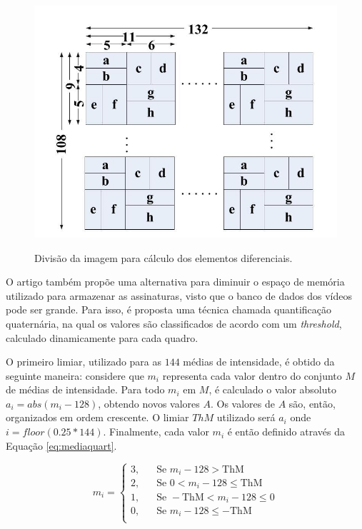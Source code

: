\begin{figure}[h]
  \centering
    \caption{Divisão da imagem para cálculo dos elementos diferenciais.} 
    \includegraphics[width=\textwidth]{dados/figuras/sf_division.png}
    \label{fig:divsceneframe}
\end{figure}

O artigo também propõe uma alternativa para diminuir o espaço de memória utilizado para armazenar as assinaturas, visto que o banco de dados dos vídeos pode ser grande. Para isso, é proposta uma técnica chamada quantificação quaternária, na qual os valores são classificados de acordo com um \textit{threshold}, calculado dinamicamente para cada quadro.

O primeiro limiar, utilizado para as $144$ médias de intensidade, é obtido da seguinte maneira: considere que $m_i$ representa cada valor dentro do conjunto $M$ de médias de intensidade. Para todo $m_i$ em $M$, é calculado o valor absoluto $a_i = abs(m_i - 128)$, obtendo novos valores $A$. Os valores de $A$ são, então, organizados em ordem crescente. O limiar $ThM$ utilizado será $a_i$ onde $i = floor(0.25*144)$. Finalmente, cada valor $m_i$ é então definido através da Equação \ref{eq:mediaquart}.

\begin{equation}
	\label{eq:mediaquart}
	m_i = 
     \begin{cases}
       \text{3,} &\quad\text{Se } m_i-128 > \text{ThM} \\
       \text{2,} &\quad\text{Se } 0 < m_i - 128 \le \text{ThM} \\
       \text{1,} &\quad\text{Se } -\text{ThM} < m_i - 128 \le 0 \\
       \text{0,} &\quad\text{Se } m_i - 128 \le -\text{ThM} \\ 
     \end{cases}
\end{equation}

